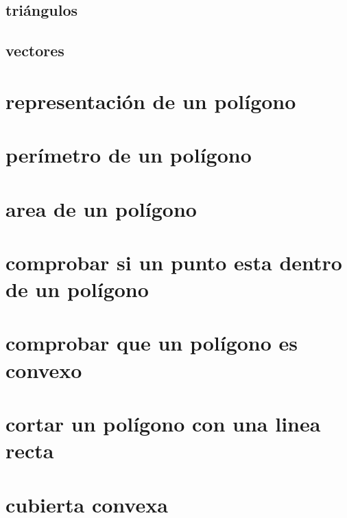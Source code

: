 \documentclass[11pt,a4paper]{book}
\begin{document}
\subsection{triángulos}
\subsection{vectores}
\section{representación de un polígono}
\section{perímetro de un polígono}
\section{area de un polígono}
\section{comprobar si un punto esta dentro de un polígono}
\section{comprobar que un polígono es convexo}
\section{cortar un polígono con una linea recta}
\section{cubierta convexa}
\end{document}
